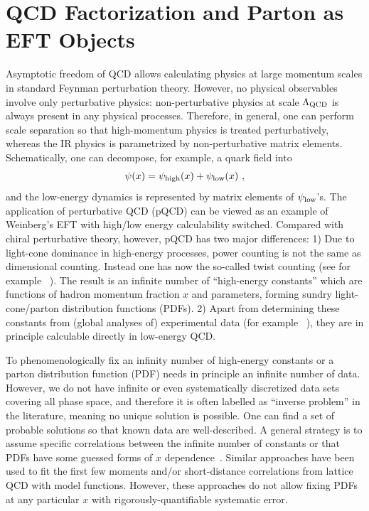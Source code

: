 \documentclass[prd,aps,twocolumn,preprintnumbers,showpacs,nofootinbib,superscriptaddress,notitlepage]{revtex4-1}
\begin{document}
\section{QCD Factorization and Parton as EFT Objects}

Asymptotic freedom of QCD allows calculating physics at large momentum scales in standard Feynman perturbation theory. However, no physical observables involve only perturbative physics: non-perturbative physics at scale $\Lambda_{\rm QCD}$ is always present in any physical processes. Therefore, in general, one can perform scale separation so that high-momentum physics is treated perturbatively, whereas the IR physics is parametrized by non-perturbative matrix elements. Schematically, one can decompose, for example, a quark field into
\begin{equation}
    \psi(x) = \psi_{\rm high} (x) + \psi_{\rm low}(x) \ , 
\end{equation}
and the low-energy dynamics is represented by matrix elements of $\psi_{\rm low}$'s. The application of perturbative QCD (pQCD) can be viewed as an example of Weinberg's EFT with high/low energy calculability switched. 
Compared with chiral perturbative theory, however, pQCD has two major differences: 1) Due to light-cone dominance in high-energy processes, power counting is not the same as dimensional counting. Instead one has now the so-called twist counting (see for example ~\cite{Peskin:1995ev}). The result is an infinite number of ``high-energy constants'' which are functions of hadron momentum fraction $x$ and parameters, forming sundry light-cone/parton distribution functions (PDFs). 2) Apart from determining these constants from (global analyses of) experimental data (for example ~\cite{NNPDF:2017mvq,Hou:2019efy}), they are in principle calculable directly in low-energy QCD. 

To phenomenologically fix an infinity number of high-energy constants or a parton distribution function (PDF) needs in principle an infinite number of data. However, we do not have infinite or even systematically discretized data sets covering all phase space, and therefore it is often labelled as ``inverse problem'' in the literature, meaning no unique solution is possible. One can find a set of probable solutions so that known data are well-described. A general strategy is to assume specific correlations between the infinite number of constants or that PDFs have some guessed forms of $x$ dependence~\cite{Hou:2019efy}. Similar approaches have been used to fit the first few moments and/or short-distance correlations from lattice QCD with model functions. However, these approaches do not allow fixing PDFs at any particular $x$ with rigorously-quantifiable systematic error.
\end{document}
